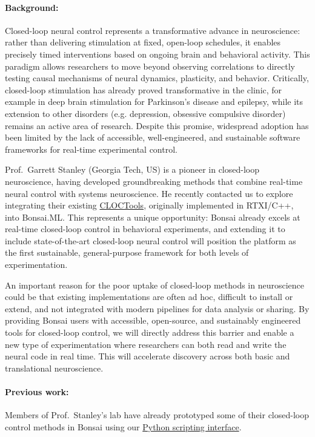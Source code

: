 \paragraph{Background:} Closed-loop neural control represents a transformative
advance in neuroscience:  rather than delivering stimulation at fixed,
open-loop schedules, it enables precisely timed interventions based on ongoing
brain and behavioral activity. This paradigm allows researchers to move beyond
observing correlations to  directly testing causal mechanisms of neural
dynamics, plasticity, and behavior. Critically, closed-loop stimulation has
already proved transformative in the  clinic, for example in deep brain
stimulation for Parkinson’s disease and  epilepsy, while its extension to other
disorders (e.g. depression, obsessive  compulsive disorder) remains an active
area of research. Despite this promise, widespread adoption has been limited
by the lack of accessible, well-engineered,  and sustainable software
frameworks for real-time experimental control.

Prof.~Garrett Stanley (Georgia Tech, US) is a pioneer in closed-loop
neuroscience, having developed groundbreaking methods that combine real-time
neural control with systems neuroscience. He recently contacted us to explore
integrating their existing \href{https://cloctools.github.io/}{CLOCTools},
originally implemented in RTXI/C++, into Bonsai.ML.  This represents a unique
opportunity: Bonsai already excels at real-time closed-loop control in
behavioral experiments, and extending it to include state-of-the-art
closed-loop neural control will position the platform as the first sustainable,
general-purpose framework for both levels of experimentation.

An important reason for the poor uptake of closed-loop methods in neuroscience
could be that existing implementations are often ad hoc, difficult to install
or  extend, and not integrated with modern pipelines for data analysis or
sharing. By providing Bonsai users with accessible, open-source, and
sustainably engineered tools for closed-loop control, we will directly address
this barrier and enable a new type of experimentation where researchers can
both read and write the neural code in real time. This will accelerate
discovery across both basic and translational neuroscience.

\paragraph{Previous work:} Members of Prof.~Stanley’s lab have already
prototyped some of their closed-loop control methods in Bonsai using our
\href{https://bonsai-rx.org/python-scripting/}{Python scripting interface}.

